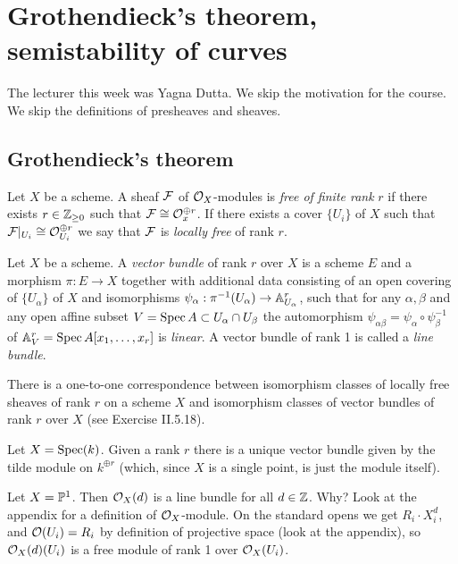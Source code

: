 \chapter{Grothendieck's theorem, semistability of curves}
The lecturer this week was Yagna Dutta.
We skip the motivation for the course.
We skip the definitions of presheaves and sheaves.
\section{Grothendieck's theorem}
\begin{definition}
	Let $X$ be a scheme. A sheaf $\mathcal{F}$ of $\mathcal{O}_X$-modules is \emph{free of finite rank} $r$ if there exists $r \in \mathbb{Z}_{\geq 0}$ such that $\mathcal{F} \cong \mathcal{O}_x^{\oplus r}$. If there exists a cover $\{U_i\}$ of $X$ such that $\mathcal{F}|_{U_i} \cong \mathcal{O}_{U_i}^{\oplus r}$ we say that $\mathcal{F}$ is \emph{locally free} of rank $r$.
\end{definition}

\begin{definition}
	Let $X$ be a scheme. A \emph{vector bundle} of rank $r$ over $X$ is a scheme $E$ and a morphism $\pi: E \to X$ together with additional data consisting of an open covering of $\{U_\alpha\}$ of $X$ 
	and isomorphisms $\psi_\alpha: \pi^{-1}(U_\alpha) \to \mathbb{A}^r_{U_\alpha}$, such that for any $\alpha, \beta$ and any open affine subset $V = \operatorname{Spec} A \subset U_\alpha \cap U_\beta$ the automorphism $\psi_{\alpha\beta} = \psi_\alpha \circ \psi^{-1}_\beta$ of $\mathbb{A}^r_{V} = \operatorname{Spec} A [x_1, \ldots, x_r]$ is \emph{linear}. A vector bundle of rank 1 is called a \emph{line bundle}.
\end{definition}

\begin{rmk}
	There is a one-to-one correspondence between isomorphism classes of locally free sheaves of rank $r$ on a scheme $X$ and isomorphism classes of vector bundles of rank $r$ over $X$ (see \cite{hartshorne2013algebraic} Exercise II.5.18).
\end{rmk}

\begin{example}
	Let $X = \operatorname{Spec}(k)$. Given a rank $r$ there is a unique vector bundle given by the tilde module on $k^{\oplus r}$ (which, since $X$ is a single point, is just the module itself).  
\end{example}

\begin{example}
	Let $X = \mathbb{P}^1$. Then $\mathcal{O}_X(d)$ is a line bundle for all $d \in \mathbb{Z}$. Why? Look at the appendix for a definition of $\mathcal{O}_X$-module. On the standard opens we get ${R_i \cdot X_i^d}$, and $\mathcal{O}(U_i) = R_i$ by definition of projective space (look at the appendix), so $\mathcal{O}_X(d)(U_i)$ is a free module of rank 1 over $\mathcal{O}_X(U_i)$. 
\end{example}

